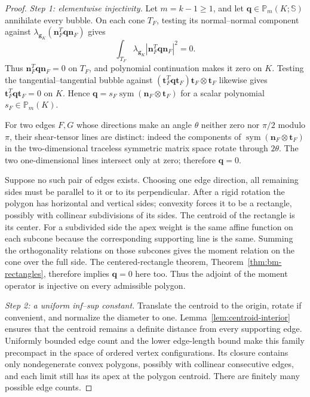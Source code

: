 \documentclass[review,hidelinks,onefignum,onetabnum]{siamart251216}
\newcommand{\sym}{\operatorname{sym}}
\begin{document}
\begin{proof}
\emph{Step 1: elementwise injectivity.}
Let $m=k-1\ge1$, and let
$\boldsymbol q\in\mathbb P_m(K;\mathbb S)$ annihilate every bubble.
On each cone $T_F$, testing its normal--normal component against
$\lambda_{\boldsymbol g_K}
(\boldsymbol n_F^T\boldsymbol q\boldsymbol n_F)$ gives
\[
 \int_{T_F}\lambda_{\boldsymbol g_K}
 |\boldsymbol n_F^T\boldsymbol q\boldsymbol n_F|^2=0.
\]
Thus $\boldsymbol n_F^T\boldsymbol q\boldsymbol n_F=0$ on $T_F$,
and polynomial continuation makes it zero on $K$.
Testing the tangential--tangential bubble against
$(\boldsymbol t_F^T\boldsymbol q\boldsymbol t_F)
\boldsymbol t_F\otimes\boldsymbol t_F$
likewise gives
$\boldsymbol t_F^T\boldsymbol q\boldsymbol t_F=0$ on $K$.
Hence
$\boldsymbol q=s_F\sym(\boldsymbol n_F\otimes\boldsymbol t_F)$
for a scalar polynomial $s_F\in\mathbb P_m(K)$.

For two edges $F,G$ whose directions make an angle $\theta$ neither
zero nor $\pi/2$ modulo $\pi$, their shear-tensor lines are distinct:
indeed the components of
$\sym(\boldsymbol n_F\otimes\boldsymbol t_F)$
in the two-dimensional traceless symmetric matrix space rotate through
$2\theta$. The two one-dimensional lines intersect only at zero;
therefore $\boldsymbol q=0$.

Suppose no such pair of edges exists. Choosing one edge direction,
all remaining sides must be parallel to it or to its perpendicular.
After a rigid rotation the polygon has horizontal and vertical sides;
convexity forces it to be a rectangle, possibly with collinear
subdivisions of its sides. The centroid of the rectangle is its center.
For a subdivided side the apex weight is the same affine function on
each subcone because the corresponding supporting line is the same.
Summing the orthogonality relations on those subcones gives the
moment relation on the cone over the full side.
The centered-rectangle theorem, Theorem~\ref{thm:bm-rectangles},
therefore implies $\boldsymbol q=0$ here too. Thus the adjoint of
the moment operator is injective on every admissible polygon.

\emph{Step 2: a uniform inf--sup constant.}
Translate the centroid to the origin, rotate if convenient, and
normalize the diameter to one. Lemma~\ref{lem:centroid-interior}
ensures that the centroid remains a definite distance from every
supporting edge. Uniformly bounded edge count and the lower
edge-length bound make this family precompact in the space of
ordered vertex configurations. Its closure contains only
nondegenerate convex polygons, possibly with collinear consecutive
edges, and each limit still has its apex at the polygon centroid.
There are finitely many possible edge counts.


\end{proof}
\end{document}
